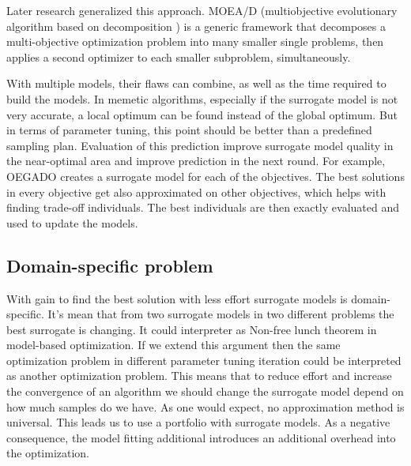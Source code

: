             Later research generalized this approach. MOEA/D (multiobjective evolutionary algorithm based on decomposition \cite{ZhangL07}) is a generic framework that decomposes a multi-objective optimization problem into many smaller single problems, then applies a second optimizer to each smaller subproblem, simultaneously.
    
            With multiple models, their flaws can combine, as well as the time required to build the models. In memetic algorithms, especially if the surrogate model is not very accurate, a local optimum can be found instead of the global optimum. But in terms of parameter tuning, this point should be better than a predefined sampling plan. Evaluation of this prediction improve surrogate model quality in the near-optimal area and improve prediction in the next round.
            For example, OEGADO \cite{ChafekarSRX05} creates a surrogate model for each of the objectives. The best solutions in every objective get also approximated on other objectives, which helps with finding trade-off individuals. The best individuals are then exactly evaluated and used to update the models.
        

        \subsection{Domain-specific problem}
        With gain to find the best solution with less effort surrogate models is domain-specific. It's mean that from two surrogate models in two different problems the best surrogate is changing. It could interpreter as Non-free lunch theorem in model-based optimization. If we extend this argument then the same optimization problem in different parameter tuning iteration could be interpreted as another optimization problem. This means that to reduce effort and increase the convergence of an algorithm we should change the surrogate model depend on how much samples do we have. As one would expect, no approximation method is universal.
        This leads us to use a portfolio with surrogate models. As a negative consequence, the model fitting additional introduces an additional overhead into the optimization.



